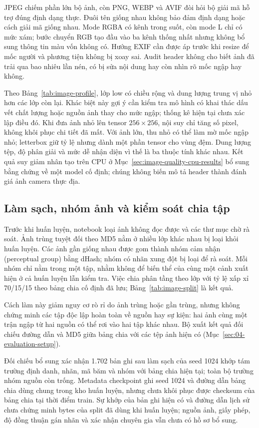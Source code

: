 JPEG chiếm phần lớn bộ ảnh, còn PNG, WEBP và AVIF đòi hỏi bộ giải mã hỗ trợ đúng định dạng thực. Đuôi tên giống nhau không bảo đảm định dạng hoặc cách giải mã giống nhau. Mode RGBA có kênh trong suốt, còn mode L chỉ có mức xám; bước chuyển RGB tạo đầu vào ba kênh thống nhất nhưng không bổ sung thông tin màu vốn không có. Hướng EXIF cần được áp trước khi resize để mốc người và phương tiện không bị xoay sai. Audit header không cho biết ảnh đã trải qua bao nhiêu lần nén, có bị sửa nội dung hay còn nhìn rõ mốc ngập hay không.

Theo Bảng~\ref{tab:image-profile}, lớp low có chiều rộng và dung lượng trung vị nhỏ hơn các lớp còn lại. Khác biệt này gợi ý cần kiểm tra mô hình có khai thác dấu vết chất lượng hoặc nguồn ảnh thay cho mức ngập; thống kê hiện tại chưa xác lập điều đó. Khi đưa ảnh nhỏ lên tensor $256\times256$, nội suy chỉ tăng số pixel, không khôi phục chi tiết đã mất. Với ảnh lớn, thu nhỏ có thể làm mờ mốc ngập nhỏ; letterbox giữ tỷ lệ nhưng dành một phần tensor cho vùng đệm. Dung lượng tệp, độ phân giải và mức dễ nhận diện vì thế là ba thuộc tính khác nhau. Kết quả suy giảm nhân tạo trên CPU ở Mục~\ref{sec:image-quality-cpu-results} bổ sung bằng chứng về một model cố định; chúng không biến mô tả header thành đánh giá ảnh camera thực địa.

\subsection{Làm sạch, nhóm ảnh và kiểm soát chia tập}
Trước khi huấn luyện, notebook loại ảnh không đọc được và các thư mục chờ rà soát. Ảnh trùng tuyệt đối theo MD5 nằm ở nhiều lớp khác nhau bị loại khỏi huấn luyện. Các ảnh gần giống nhau được gom thành nhóm cảm nhận (perceptual group) bằng dHash; nhóm có nhãn xung đột bị loại để rà soát. Mỗi nhóm chỉ nằm trong một tập, nhằm không để biến thể của cùng một cảnh xuất hiện ở cả huấn luyện lẫn kiểm tra. Việc chia phân tầng theo lớp với tỷ lệ xấp xỉ 70/15/15 theo bảng chia cố định đã lưu; Bảng~\ref{tab:image-split} là kết quả.

Cách làm này giảm nguy cơ rò rỉ do ảnh trùng hoặc gần trùng, nhưng không chứng minh các tập độc lập hoàn toàn về nguồn hay sự kiện: hai ảnh cùng một trận ngập từ hai nguồn có thể rơi vào hai tập khác nhau. Bộ xuất kết quả đối chiếu đường dẫn và MD5 giữa bảng chia với các tệp ảnh hiện có (Mục~\ref{sec:04-evaluation-setup}).

Đối chiếu bổ sung xác nhận 1.702 bản ghi sau làm sạch của seed 1024 khớp tám trường định danh, nhãn, mã băm và nhóm với bảng chia hiện tại; toàn bộ trường nhóm nguồn còn trống. Metadata checkpoint ghi seed 1024 và đường dẫn bảng chia dùng chung trong kho huấn luyện, nhưng chưa khôi phục được checksum của bảng chia tại thời điểm train. Sự khớp của bản ghi hiện có và đường dẫn lịch sử chưa chứng minh bytes của split đã dùng khi huấn luyện; nguồn ảnh, giấy phép, độ đồng thuận gán nhãn và xác nhận chuyên gia vẫn chưa có hồ sơ bổ sung.

